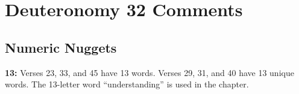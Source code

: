 \section{Deuteronomy 32 Comments}


\subsection{Numeric Nuggets}
\textbf{13:} Verses 23, 33, and 45 have 13 words. Verses 29, 31,  and 40 have 13 unique words. The 13-letter word ``understanding'' is used in the chapter.
